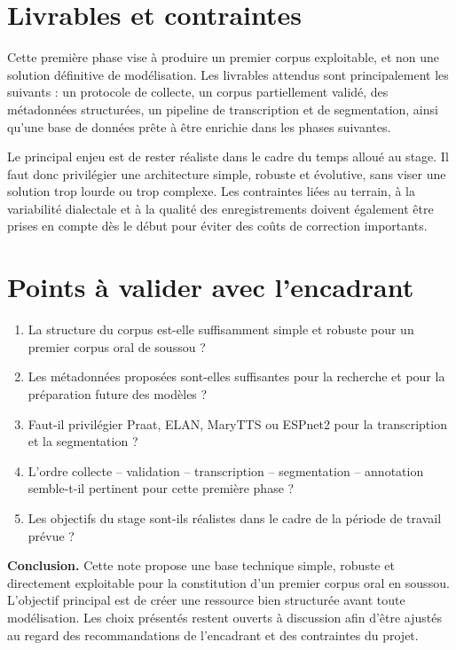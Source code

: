 \section{Livrables et contraintes}

Cette première phase vise à produire un premier corpus exploitable, et
non une solution définitive de modélisation. Les livrables attendus sont
principalement les suivants : un protocole de collecte, un corpus
partiellement validé, des métadonnées structurées, un pipeline de
transcription et de segmentation, ainsi qu'une base de données prête à
être enrichie dans les phases suivantes.

Le principal enjeu est de rester réaliste dans le cadre du temps
alloué au stage. Il faut donc privilégier une architecture simple,
robuste et évolutive, sans viser une solution trop lourde ou trop
complexe. Les contraintes liées au terrain, à la variabilité dialectale
et à la qualité des enregistrements doivent également être prises en
compte dès le début pour éviter des coûts de correction importants.

\section{Points à valider avec l'encadrant}

\begin{enumerate}
\item La structure du corpus est-elle suffisamment simple et robuste pour
un premier corpus oral de soussou ?
\item Les métadonnées proposées sont-elles suffisantes pour la
recherche et pour la préparation future des modèles ?
\item Faut-il privilégier Praat, ELAN, MaryTTS ou ESPnet2 pour la
transcription et la segmentation ?
\item L'ordre collecte -- validation -- transcription -- segmentation --
annotation semble-t-il pertinent pour cette première phase ?
\item Les objectifs du stage sont-ils réalistes dans le cadre de la
période de travail prévue ?
\end{enumerate}

\textbf{Conclusion.} Cette note propose une base technique simple,
robuste et directement exploitable pour la constitution d'un premier
corpus oral en soussou. L'objectif principal est de créer une ressource
bien structurée avant toute modélisation. Les choix présentés restent
ouverts à discussion afin d'être ajustés au regard des recommandations
de l'encadrant et des contraintes du projet.